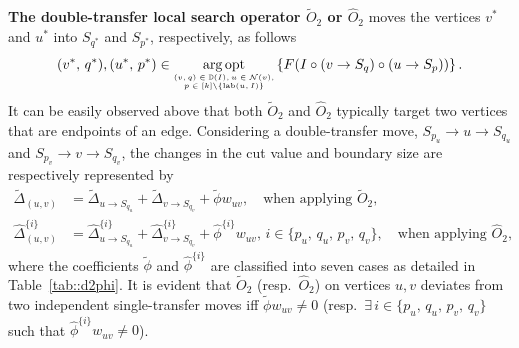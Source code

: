 \documentclass[12pt, a4paper]{article}%
\DeclareMathOperator*{\argopt}{\ensuremath{arg\,opt}}
\DeclareMathOperator*{\opt}{\ensuremath{opt}}
\newcommand{\labeling}{\ensuremath{\mathrm{lab}}}
\numberwithin{equation}{section}
\theoremstyle{plain}
\begin{document}
			
			\textbf{The double-transfer local search operator $\widetilde{O}_2$ or $\widehat{O}_2$} moves the vertices ${v}^*$ and ${u}^*$ into $ S_{{q}^*}$ and $ S_{{p}^*}$, respectively, as follows				
			\begin{equation}
				\label{choice::o2cut}
				({v}^*,\,{q}^*), ({u}^*,\,{p}^*) \in
				\argopt_{\begin{tiny}
						\begin{matrix}
							(v,q)\in\mathbb{D}(I),u\in\mathcal{N}(v),\\
							p\in[k]\backslash\{\labeling(u,I)\}
						\end{matrix}
				\end{tiny}}\left\{F(I\circ (v\rightarrow S_q)\circ (u\rightarrow S_p))\right\}.
			\end{equation}
			It can be easily observed above that both $\widetilde{O}_2$ and $\widehat{O}_2$ typically target two vertices that are endpoints of an edge. Considering a double-transfer move, $S_{p_u}\rightarrow u\rightarrow S_{q_u}$ and $S_{p_v}\rightarrow v \rightarrow S_{q_v}$, the changes in the cut value and boundary size are respectively represented by
			\begin{align}
				\widetilde{\Delta}_{(u,v)}&=\widetilde{\Delta}_{u\rightarrow S_{q_u}}+\widetilde{\Delta}_{v\rightarrow S_{q_v}}+\widetilde{\phi}w_{uv},\quad \text{when applying } \widetilde{O}_2,\label{delta::o2cut}\\
				\widehat{\Delta}_{(u,v)}^{\{i\}}&=\widehat{\Delta}_{{u\rightarrow S_{q_u}}}^{\{i\}}+\widehat{\Delta}_{{v\rightarrow S_{q_v}}}^{\{i\}}+\widehat{\phi}^{\{i\}}w_{uv},\,i\in\{p_u,\,q_u,\,p_v,\,q_v\}, \quad \text{when applying } \widehat{O}_2,	\label{delta::o2partial}
			\end{align}
			where the coefficients $\widetilde{\phi}$ and $\widehat{\phi}^{\{i\}}$ are classified into seven cases as detailed in Table~\ref{tab::d2phi}. It is evident that $\widetilde{O}_2$ (resp.~$\widehat{O}_2$) on vertices $u,v$ deviates from two independent single-transfer moves iff $\widetilde{\phi}w_{uv}\neq 0$ (resp.~$\exists\, i\in\{p_u,\,q_u,\,p_v,\,q_v\}$ such that $\widehat{\phi}^{\{i\}}w_{uv}\neq 0$).
			
\end{document}
